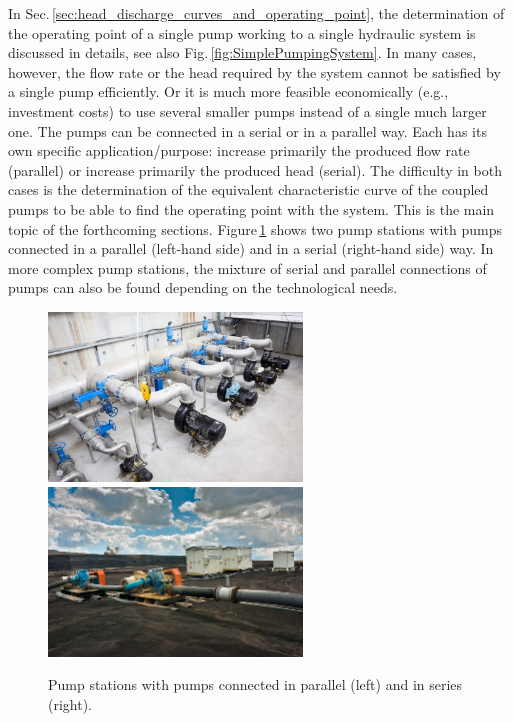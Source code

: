 In Sec.\,\ref{sec:head_discharge_curves_and_operating_point}, the determination of the operating point of a single pump working to a single hydraulic system is discussed in details, see also Fig.\,\ref{fig:SimplePumpingSystem}. In many cases, however, the flow rate or the head required by the system cannot be satisfied by a single pump efficiently. Or it is much more feasible economically (e.g., investment costs) to use several smaller pumps instead of a single much larger one. The pumps can be connected in a serial or in a parallel way. Each has its own specific application/purpose: increase primarily the produced flow rate (parallel) or increase primarily the produced head (serial). The difficulty in both cases is the determination of the equivalent characteristic curve of the coupled pumps to be able to find the operating point with the system. This is the main topic of the forthcoming sections. Figure\,\ref{fig:pump_stations_examples} shows two pump stations with pumps connected in a parallel (left-hand side) and in a serial (right-hand side) way. In more complex pump stations, the mixture of serial and parallel connections of pumps can also be found depending on the technological needs.

\begin{figure}[ht!]
	\centering
		\includegraphics[height=4.5cm]{Control/Figures/Pump_Station_Parallel_Connection.jpg}
		\includegraphics[height=4.5cm]{Control/Figures/Pump_Station_Serial_Connection.jpg}
	\caption{Pump stations with pumps connected in parallel (left) and in series (right).}
	\label{fig:pump_stations_examples}
\end{figure}

